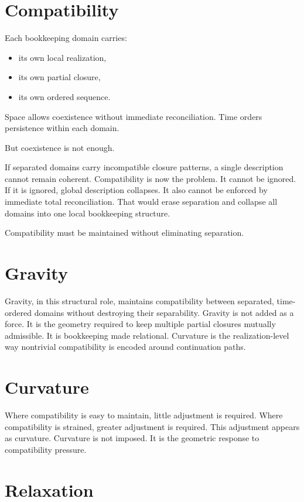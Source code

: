 \documentclass[11pt,twoside,openright]{book}
\begin{document}
\section*{Compatibility}

Each bookkeeping domain carries:

\begin{itemize}
\item its own local realization,
\item its own partial closure,
\item its own ordered sequence.
\end{itemize}

Space allows coexistence without immediate reconciliation. Time orders persistence within each domain.

But coexistence is not enough.

If separated domains carry incompatible closure patterns, a single description cannot remain coherent. Compatibility is now the problem. It cannot be ignored. If it is ignored, global description collapses. It also cannot be enforced by immediate total reconciliation. That would erase separation and collapse all domains into one local bookkeeping structure.

Compatibility must be maintained without eliminating separation.

\section*{Gravity}

Gravity, in this structural role, maintains compatibility between separated, time-ordered domains without destroying their separability. Gravity is not added as a force. It is the geometry required to keep multiple partial closures mutually admissible. It is bookkeeping made relational. Curvature is the realization-level way nontrivial compatibility is encoded around continuation paths.

\section*{Curvature}

Where compatibility is easy to maintain, little adjustment is required. Where compatibility is strained, greater adjustment is required. This adjustment appears as curvature. Curvature is not imposed. It is the geometric response to compatibility pressure.

\section*{Relaxation}
\end{document}
